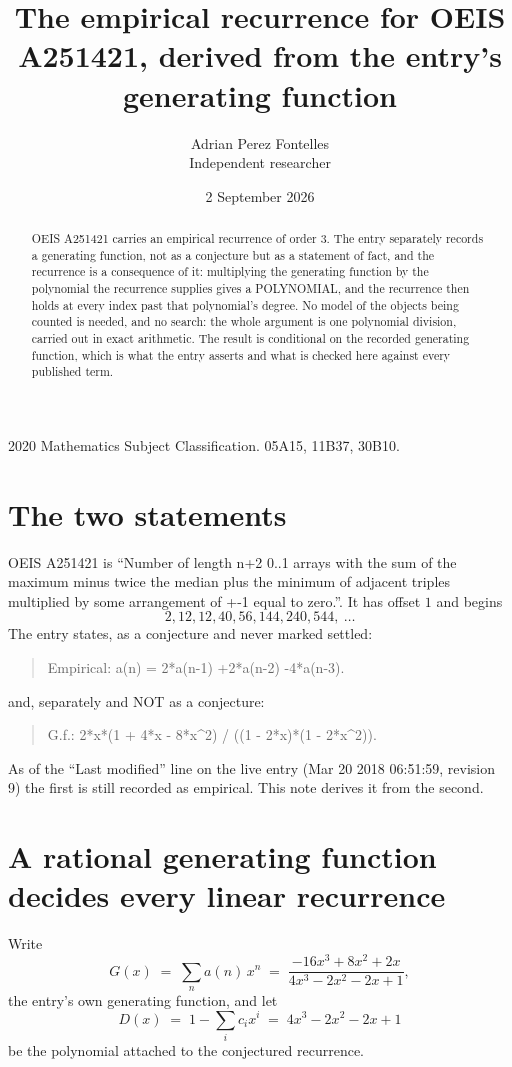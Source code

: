 \documentclass[11pt,a4paper]{article}
\title{The empirical recurrence for OEIS A251421, derived from the entry's generating function}
\author{Adrian Perez Fontelles\\ \small Independent researcher}
\date{2 September 2026}
\theoremstyle{plain}
\theoremstyle{definition}
\begin{document}
\maketitle

\begin{abstract}
OEIS A251421 carries an empirical recurrence of order $3$. The entry separately records a
generating function, not as a conjecture but as a statement of fact, and the recurrence is a
consequence of it: multiplying the generating function by the polynomial the recurrence
supplies gives a POLYNOMIAL, and the recurrence then holds at every index past that
polynomial's degree. No model of the objects being counted is needed, and no search: the
whole argument is one polynomial division, carried out in exact arithmetic. The result is
conditional on the recorded generating function, which is what the entry asserts and what is
checked here against every published term.
\end{abstract}

\noindent\small 2020 Mathematics Subject Classification. 05A15, 11B37, 30B10.\normalsize

\section{The two statements}

OEIS A251421 is ``Number of length n+2 0..1 arrays with the sum of the maximum minus twice the median plus the minimum of adjacent triples multiplied by some arrangement of +-1 equal to zero.''. It has offset $1$ and begins
\[
2, 12, 12, 40, 56, 144, 240, 544,\ \dots
\]
The entry states, as a conjecture and never marked settled:
\begin{quote}
Empirical: a(n) = 2*a(n-1) +2*a(n-2) -4*a(n-3).
\end{quote}
and, separately and NOT as a conjecture:
\begin{quote}
G.f.: 2*x*(1 + 4*x - 8*x\^{}2) / ((1 - 2*x)*(1 - 2*x\^{}2)).
\end{quote}
As of the ``Last modified'' line on the live entry (Mar 20 2018 06:51:59, revision 9) the first is still
recorded as empirical. This note derives it from the second.

\section{A rational generating function decides every linear recurrence}

Write
\[
G(x)\;=\;\sum_{n}a(n)\,x^{n}\;=\;\frac{- 16 x^{3} + 8 x^{2} + 2 x}{4 x^{3} - 2 x^{2} - 2 x + 1},
\]
the entry's own generating function, and let
\[
D(x)\;=\;1-\sum_i c_i x^{i}\;=\;4 x^{3} - 2 x^{2} - 2 x + 1
\]
be the polynomial attached to the conjectured recurrence.
\end{document}
